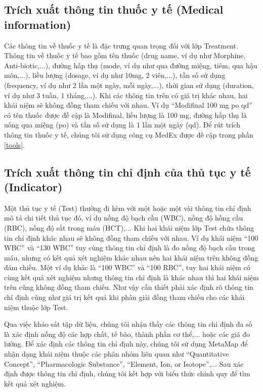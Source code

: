 \subsection*{Trích xuất thông tin thuốc y tế (Medical information)}
Các thông tin về thuốc y tế là đặc trưng quan trọng đối với lớp Treatment. Thông tin về thuốc y tế bao gồm tên thuốc (drug name, ví dụ như Morphine, Anti-biotic,...), đường hấp thụ (mode, ví dụ như qua đường miệng, tiêm, qua hậu môn,...), liều lượng (dosage, ví dụ như 10mg, 2 viên,...), tần số sử dụng (frequency, ví dụ như 2 lần một ngày, mỗi ngày,...), thời gian sử dụng (duration, ví dụ như 3 tuần, 1 tháng,...). Khi các thông tin trên có giá trị khác nhau, hai khái niệm sẽ không đồng tham chiếu với nhau. Ví dụ ``Modifinal 100 mg po qd'' có tên thuốc được đề cập là Modifinal, liều lượng là 100 mg, đường hấp thụ là uống qua miệng (po) và tần số sử dụng là 1 lần một ngày (qd). Để rút trích thông tin thuốc y tế, chúng tôi sử dụng công cụ MedEx được đề cập trong phần \ref{tools}.

\subsection*{Trích xuất thông tin chỉ định của thủ tục y tế (Indicator)}
Một thủ tục y tế (Test) thường đi kèm với một hoặc một vài thông tin chỉ định mô tả chi tiết thủ tục đó, ví dụ nồng độ bạch cầu (WBC), nồng độ hồng cầu (RBC), nồng độ sắt trong máu (HCT),... Khi hai khái niệm lớp Test chứa thông tin chỉ định khác nhau sẽ không đồng tham chiếu với nhau. Ví dụ khái niệm ``100 WBC'' và ``130 WBC'' tuy cùng thông tin chỉ định là đo nồng độ bạch cầu trong máu, nhưng có kết quả xét nghiệm khác nhau nên hai khái niệm trên không đồng đám chiếu. Một ví dụ khác là ``100 WBC'' và ``100 RBC'', tuy hai khái niệm có cùng kết quả xét nghiệm nhưng thông tin chỉ định là khác nhau thì hai khái niệm trên cũng không đồng tham chiếu. Như vậy cần thiết phải xác định rõ thông tin chỉ định cũng như giá trị kết quả khi phân giải đồng tham chiếu cho các khái niệm thuộc lớp Test.

Qua việc khảo sát tập dữ liệu, chúng tôi nhận thấy các thông tin chỉ định đa số là xác định nồng độ các hợp chất, tế bào, thành phần cơ thể,... hoặc các giá đo lường. Để xác định các thông tin chỉ định này, chúng tôi sử dụng MetaMap để nhận dạng khái niệm thuộc các phân nhóm liên quan như ``Quantitative Concept'', ``Pharmacologic Substance'', ``Element, Ion, or Isotope'',... Sau xác định được thông tin chỉ định, chúng tôi kết hợp với biểu thức chính quy để tìm kết quả xét nghiệm.

